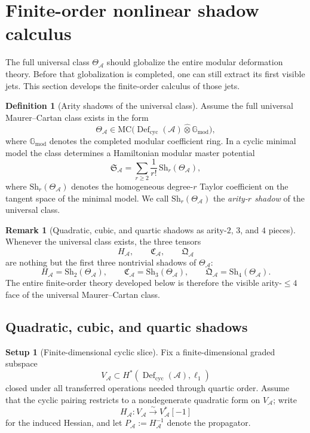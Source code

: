 \documentclass[11pt,oneside]{memoir}
\numberwithin{equation}{chapter}
\theoremstyle{definition}
\newtheorem{definition}[theorem]{Definition}
\newtheorem{remark}[theorem]{Remark}
\newtheorem{setup}[theorem]{Setup}
\newcommand{\cA}{\mathcal A}
\newcommand{\Defcyc}{\operatorname{Def}_{\mathrm{cyc}}}
\begin{document}
\section{Finite-order nonlinear shadow calculus}
\label{sec:nms-shadow-calculus}

The full universal class $\Theta_{\cA}$ should globalize the entire modular deformation theory.  Before that globalization is completed, one can still extract its first visible jets.  This section develops the finite-order calculus of those jets.

\begin{definition}[Arity shadows of the universal class]
\label{def:nms-arity-shadows}
Assume the full universal Maurer--Cartan class exists in the form
\[
\Theta_{\cA}\in \mathrm{MC}\bigl(\Defcyc(\cA)\widehat\otimes \mathbb G_{\mathrm{mod}}\bigr),
\]
where $\mathbb G_{\mathrm{mod}}$ denotes the completed modular coefficient ring.  In a cyclic minimal model the class determines a Hamiltonian modular master potential
\[
\mathfrak S_{\cA}=\sum_{r\ge 2}\frac{1}{r!}\,\mathrm{Sh}_r(\Theta_{\cA}),
\]
where $\mathrm{Sh}_r(\Theta_{\cA})$ denotes the homogeneous degree-$r$ Taylor coefficient on the tangent space of the minimal model.  We call $\mathrm{Sh}_r(\Theta_{\cA})$ the \emph{arity-$r$ shadow} of the universal class.
\end{definition}

\begin{remark}[Quadratic, cubic, and quartic shadows as arity-$2$, $3$, and $4$ pieces]
\label{rem:nms-hcq-as-arity-shadows}
Whenever the universal class exists, the three tensors
\[
H_{\cA},\qquad \mathfrak C_{\cA},\qquad \mathfrak Q_{\cA}
\]
are nothing but the first three nontrivial shadows of $\Theta_{\cA}$:
\[
H_{\cA}=\mathrm{Sh}_2(\Theta_{\cA}),
\qquad
\mathfrak C_{\cA}=\mathrm{Sh}_3(\Theta_{\cA}),
\qquad
\mathfrak Q_{\cA}=\mathrm{Sh}_4(\Theta_{\cA}).
\]
The entire finite-order theory developed below is therefore the visible arity-$\le 4$ face of the universal Maurer--Cartan class.
\end{remark}

\subsection{Quadratic, cubic, and quartic shadows}
\label{subsec:nms-shadow-jets}

\begin{setup}[Finite-dimensional cyclic slice]
\label{setup:nms-cyclic-slice}
Fix a finite-dimensional graded subspace
\[
V_{\cA}\subset H^*(\Defcyc(\cA),\ell_1)
\]
closed under all transferred operations needed through quartic order.  Assume that the cyclic pairing restricts to a nondegenerate quadratic form on $V_{\cA}$; write
\[
H_{\cA}\colon V_{\cA}\xrightarrow{\sim}V_{\cA}^*[-1]
\]
for the induced Hessian, and let $P_{\cA}:=H_{\cA}^{-1}$ denote the propagator.
\end{setup}
\end{document}
